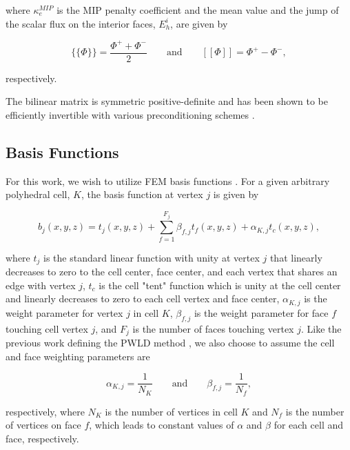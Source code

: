 \documentclass{anstrans}
\begin{document}
\noindent where $\kappa_e^{MIP}$ is the MIP penalty coefficient and the mean value and the jump of the scalar flux on the interior faces, $E_h^i$, are given by 

\begin{equation}
\{\!\{ \Phi \}\!\} = \frac{\Phi^{+} + \Phi^{-}}{2} \qquad \text{and} \qquad  [\![ \Phi ]\!] = \Phi^{+} - \Phi^{-},
\label{eq::mean_and_jump}
\end{equation}

\noindent respectively.

The bilinear matrix is symmetric positive-definite and has been shown to be efficiently invertible with various preconditioning schemes \cite{ref::DSA_2D_arb_poly}.

\subsection{Basis Functions}
\label{sec::PWLD}

For this work, we wish to utilize FEM basis functions . For a given arbitrary polyhedral cell, $K$, the basis function at vertex $j$ is given by

\begin{equation}
b_j(x,y,z) = t_j(x,y,z) + \sum_{f=1}^{F_j} \beta_{f,j} t_f(x,y,z) + \alpha_{K,j} t_c(x,y,z), 
\label{eq::3D_PWLD_basis_functions}
\end{equation}

\noindent where $t_j$ is the standard linear function with unity at vertex $j$ that linearly decreases to zero to the cell center, face center, and each vertex that shares an edge with vertex $j$, $t_c$ is the cell "tent" function which is unity at the cell center and linearly decreases to zero to each cell vertex and face center, $\alpha_{K,j}$ is the weight parameter for vertex $j$ in cell $K$, $\beta_{f,j}$ is the weight parameter for face $f$ touching cell vertex $j$, and $F_j$ is the number of faces touching vertex $j$. Like the previous work defining the PWLD method \cite{bailey2008phd}, we also choose to assume the cell and face weighting parameters are


\begin{equation}
\alpha_{K,j} = \frac{1}{N_K} \qquad \text{and} \qquad \beta_{f,j} = \frac{1}{N_f},
\label{eq::PWLD_weight_vals}
\end{equation}

\noindent respectively, where $N_K$ is the number of vertices in cell $K$ and $N_f$ is the number of vertices on face $f$, which leads to constant values of $\alpha$ and $\beta$ for each cell and face, respectively. 
\end{document}
